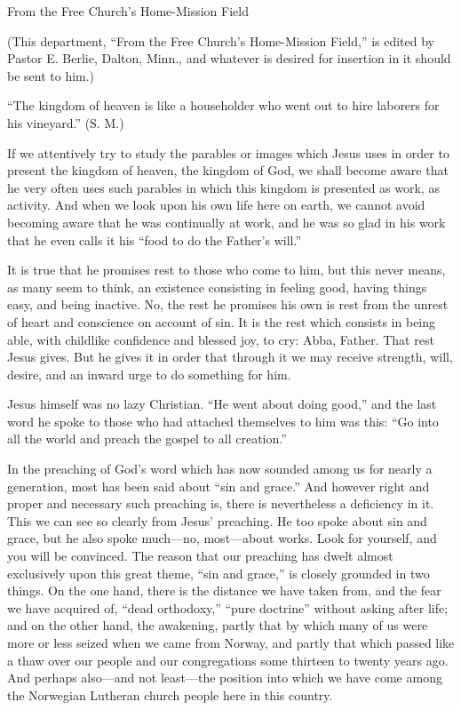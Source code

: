 
From the Free Church’s Home-Mission Field

(This department, “From the Free Church’s Home-Mission Field,” is edited by Pastor E. Berlie, Dalton, Minn., and whatever is desired for insertion in it should be sent to him.)

“The kingdom of heaven is like a householder who went out to hire laborers for his vineyard.”
(S. M.)

If we attentively try to study the parables or images which Jesus uses in order to present the kingdom of heaven, the kingdom of God, we shall become aware that he very often uses such parables in which this kingdom is presented as work, as activity. And when we look upon his own life here on earth, we cannot avoid becoming aware that he was continually at work, and he was so glad in his work that he even calls it his “food to do the Father’s will.”

It is true that he promises rest to those who come to him, but this never means, as many seem to think, an existence consisting in feeling good, having things easy, and being inactive. No, the rest he promises his own is rest from the unrest of heart and conscience on account of sin. It is the rest which consists in being able, with childlike confidence and blessed joy, to cry: Abba, Father. That rest Jesus gives. But he gives it in order that through it we may receive strength, will, desire, and an inward urge to do something for him.

Jesus himself was no lazy Christian. “He went about doing good,” and the last word he spoke to those who had attached themselves to him was this: “Go into all the world and preach the gospel to all creation.”

In the preaching of God’s word which has now sounded among us for nearly a generation, most has been said about “sin and grace.” And however right and proper and necessary such preaching is, there is nevertheless a deficiency in it. This we can see so clearly from Jesus’ preaching. He too spoke about sin and grace, but he also spoke much—no, most—about works. Look for yourself, and you will be convinced. The reason that our preaching has dwelt almost exclusively upon this great theme, “sin and grace,” is closely grounded in two things. On the one hand, there is the distance we have taken from, and the fear we have acquired of, “dead orthodoxy,” “pure doctrine” without asking after life; and on the other hand, the awakening, partly that by which many of us were more or less seized when we came from Norway, and partly that which passed like a thaw over our people and our congregations some thirteen to twenty years ago. And perhaps also—and not least—the position into which we have come among the Norwegian Lutheran church people here in this country.

